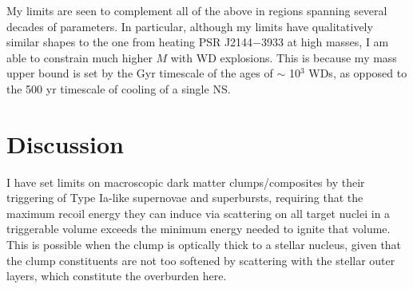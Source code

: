 \documentclass[
    twocolumn,
	prd,
        amssymb,
	preprintnumbers,
	secnumarabic,
	nofootinbib,
	superscriptaddress]{revtex4-1}
\begin{document}
My limits are seen to complement all of the above in regions spanning several decades of parameters.
In particular, although my limits have qualitatively similar shapes to the one from heating PSR J2144$-$3933 at high masses, I am able to constrain much higher $M$ with WD explosions.
This is because my mass upper bound is set by the Gyr timescale of the ages of $\sim$ 10$^3$ WDs, as opposed to the 500 yr timescale of cooling of a single NS.

\section{Discussion}
\label{sec:disc}

I have set limits on macroscopic dark matter clumps/composites by their triggering of Type Ia-like supernovae and superbursts, requiring that the maximum recoil energy they can induce via scattering on all target nuclei in a triggerable volume exceeds the minimum energy needed to ignite that volume.
This is possible when the clump is optically thick to a stellar nucleus, given that the clump constituents are not too softened by scattering with the stellar outer layers, which constitute the overburden here.
\end{document}
